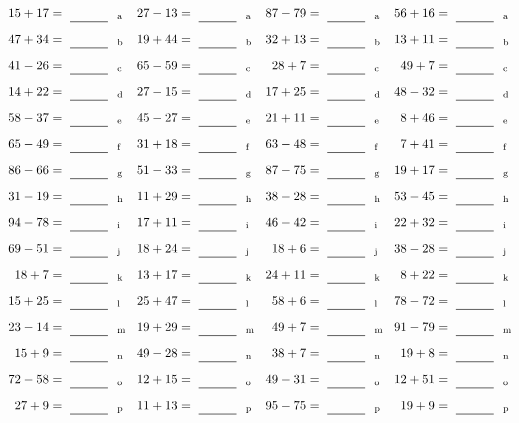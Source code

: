 \documentclass
[
  draft    = true,
  fontsize = 11pt,
  parskip  = half-
]
{scrartcl}
\begin{document}
\clearpage
\begin{align*}
    \pline{15+17}&=\rline{a}
  & \pline{27-13}&=\rline{a}
  & \pline{87-79}&=\rline{a}
  & \pline{56+16}&=\rline{a} \\[1ex]
    \pline{47+34}&=\rline{b}
  & \pline{19+44}&=\rline{b}
  & \pline{32+13}&=\rline{b}
  & \pline{13+11}&=\rline{b} \\[1ex]
    \pline{41-26}&=\rline{c}
  & \pline{65-59}&=\rline{c}
  & \pline{28+7}&=\rline{c}
  & \pline{49+7}&=\rline{c} \\[1ex]
    \pline{14+22}&=\rline{d}
  & \pline{27-15}&=\rline{d}
  & \pline{17+25}&=\rline{d}
  & \pline{48-32}&=\rline{d} \\[1ex]
    \pline{58-37}&=\rline{e}
  & \pline{45-27}&=\rline{e}
  & \pline{21+11}&=\rline{e}
  & \pline{8+46}&=\rline{e} \\[1ex]
    \pline{65-49}&=\rline{f}
  & \pline{31+18}&=\rline{f}
  & \pline{63-48}&=\rline{f}
  & \pline{7+41}&=\rline{f} \\[1ex]
    \pline{86-66}&=\rline{g}
  & \pline{51-33}&=\rline{g}
  & \pline{87-75}&=\rline{g}
  & \pline{19+17}&=\rline{g} \\[1ex]
    \pline{31-19}&=\rline{h}
  & \pline{11+29}&=\rline{h}
  & \pline{38-28}&=\rline{h}
  & \pline{53-45}&=\rline{h} \\[1ex]
    \pline{94-78}&=\rline{i}
  & \pline{17+11}&=\rline{i}
  & \pline{46-42}&=\rline{i}
  & \pline{22+32}&=\rline{i} \\[1ex]
    \pline{69-51}&=\rline{j}
  & \pline{18+24}&=\rline{j}
  & \pline{18+6}&=\rline{j}
  & \pline{38-28}&=\rline{j} \\[1ex]
    \pline{18+7}&=\rline{k}
  & \pline{13+17}&=\rline{k}
  & \pline{24+11}&=\rline{k}
  & \pline{8+22}&=\rline{k} \\[1ex]
    \pline{15+25}&=\rline{l}
  & \pline{25+47}&=\rline{l}
  & \pline{58+6}&=\rline{l}
  & \pline{78-72}&=\rline{l} \\[1ex]
    \pline{23-14}&=\rline{m}
  & \pline{19+29}&=\rline{m}
  & \pline{49+7}&=\rline{m}
  & \pline{91-79}&=\rline{m} \\[1ex]
    \pline{15+9}&=\rline{n}
  & \pline{49-28}&=\rline{n}
  & \pline{38+7}&=\rline{n}
  & \pline{19+8}&=\rline{n} \\[1ex]
    \pline{72-58}&=\rline{o}
  & \pline{12+15}&=\rline{o}
  & \pline{49-31}&=\rline{o}
  & \pline{12+51}&=\rline{o} \\[1ex]
    \pline{27+9}&=\rline{p}
  & \pline{11+13}&=\rline{p}
  & \pline{95-75}&=\rline{p}
  & \pline{19+9}&=\rline{p}
\end{align*}
\end{document}
